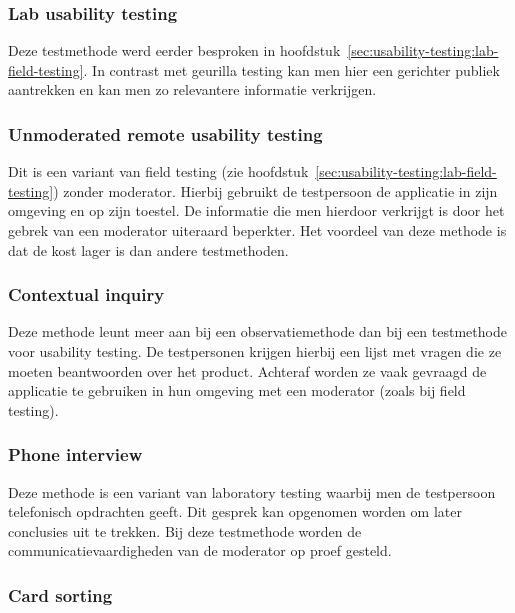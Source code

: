 \subsubsection{Lab usability testing}
\label{sec:usability-testing:testmethoden:lab}

Deze testmethode werd eerder besproken in hoofdstuk~\ref{sec:usability-testing:lab-field-testing}. In contrast met geurilla testing kan men hier een gerichter publiek aantrekken en kan men zo relevantere informatie verkrijgen.

\subsubsection{Unmoderated remote usability testing}
\label{sec:usability-testing:testmethoden:unmoderated-remote}

Dit is een variant van field testing (zie hoofdstuk~\ref{sec:usability-testing:lab-field-testing}) zonder moderator. Hierbij gebruikt de testpersoon de applicatie in zijn omgeving en op zijn toestel. De informatie die men hierdoor verkrijgt is door het gebrek van een moderator uiteraard beperkter. Het voordeel van deze methode is dat de kost lager is dan andere testmethoden.

\subsubsection{Contextual inquiry}
\label{sec:usability-testing:testmethoden:contextual-inquiry}

Deze methode leunt meer aan bij een observatiemethode dan bij een testmethode voor usability testing. De testpersonen krijgen hierbij een lijst met vragen die ze moeten beantwoorden over het product. Achteraf worden ze vaak gevraagd de applicatie te gebruiken in hun omgeving met een moderator (zoals bij field testing).

\subsubsection{Phone interview}
\label{sec:usability-testing:testmethoden:phone}

Deze methode is een variant van laboratory testing waarbij men de testpersoon telefonisch opdrachten geeft. Dit gesprek kan opgenomen worden om later conclusies uit te trekken. Bij deze testmethode worden de communicatievaardigheden van de moderator op proef gesteld.

\subsubsection{Card sorting}
\label{sec:usability-testing:testmethoden:card-sorting}


